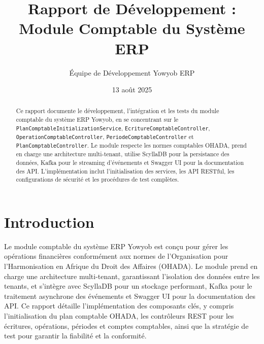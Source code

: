 \documentclass[a4paper,12pt]{article}
\title{Rapport de Développement : Module Comptable du Système ERP}
\author{Équipe de Développement Yowyob ERP}
\date{13 août 2025}
\begin{document}
\maketitle

\begin{abstract}
Ce rapport documente le développement, l'intégration et les tests du module comptable du système ERP Yowyob, en se concentrant sur le \texttt{PlanComptableInitializationService}, \texttt{EcritureComptableController}, \texttt{OperationComptableController}, \texttt{PeriodeComptableController} et \texttt{PlanComptableController}. Le module respecte les normes comptables OHADA, prend en charge une architecture multi-tenant, utilise ScyllaDB pour la persistance des données, Kafka pour le streaming d'événements et Swagger UI pour la documentation des API. L'implémentation inclut l'initialisation des services, les API RESTful, les configurations de sécurité et les procédures de test complètes.
\end{abstract}

\section{Introduction}
Le module comptable du système ERP Yowyob est conçu pour gérer les opérations financières conformément aux normes de l'Organisation pour l'Harmonisation en Afrique du Droit des Affaires (OHADA). Le module prend en charge une architecture multi-tenant, garantissant l'isolation des données entre les tenants, et s'intègre avec ScyllaDB pour un stockage performant, Kafka pour le traitement asynchrone des événements et Swagger UI pour la documentation des API. Ce rapport détaille l'implémentation des composants clés, y compris l'initialisation du plan comptable OHADA, les contrôleurs REST pour les écritures, opérations, périodes et comptes comptables, ainsi que la stratégie de test pour garantir la fiabilité et la conformité.
\end{document}
